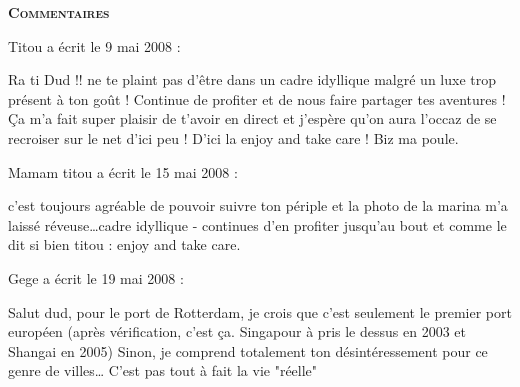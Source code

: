 \bigskip
\textbf{\textsc{Commentaires}}

\medskip
Titou a écrit le 9 mai 2008 :
\begin{displayquote}
Ra ti Dud !! ne te plaint pas d'être dans un cadre idyllique malgré un luxe trop présent à ton goût ! Continue de profiter et de nous faire partager tes aventures ! Ça m'a fait super plaisir de t'avoir en direct et j'espère qu'on aura l'occaz de se recroiser sur le net d'ici peu ! D'ici la enjoy and take care !
Biz ma poule.
\end{displayquote}

\medskip
Mamam titou a écrit le 15 mai 2008 :
\begin{displayquote}
c'est toujours agréable de pouvoir suivre ton périple et la photo de la marina m'a laissé réveuse\dots cadre idyllique - continues d'en profiter jusqu'au bout et comme le dit si bien titou : enjoy and take care.
\end{displayquote}

\medskip
Gege a écrit le 19 mai 2008 :
\begin{displayquote}
Salut dud,
pour le port de Rotterdam, je crois que c'est seulement le premier port européen (après vérification, c'est ça. Singapour à pris le dessus en 2003 et Shangai en 2005)
Sinon, je comprend totalement ton désintéressement pour ce genre de villes\dots
C'est pas tout à fait la vie "réelle"
\end{displayquote}

\vfill
